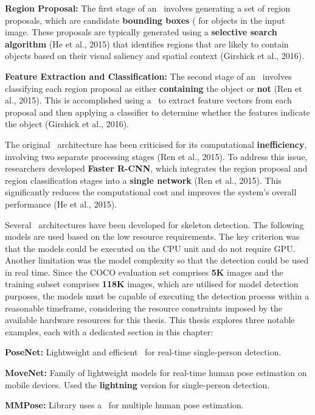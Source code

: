 \startitemize[1]
 \item {\bf Region Proposal:} The first stage of an \RCNN\ involves generating a set of region proposals, which are candidate {\bf bounding boxes} (\BBOX\) for objects in the input image. These proposals are typically generated using a {\bf selective search algorithm} (\scc He et al., 2015) that identifies regions that are likely to contain objects based on their visual saliency and spatial context (\scc Girshick et al., 2016).
 \item {\bf Feature Extraction and Classification:} The second stage of an \RCNN\ involves classifying each region proposal as either {\bf containing} the object or {\bf not} (\scc Ren et al., 2015). This is accomplished using a \CNN\ to extract feature vectors from each proposal and then applying a classifier to determine whether the features indicate the object (\scc Girshick et al., 2016).
\stopitemize

The original \RCNN\ architecture has been criticised for its computational {\bf inefficiency}, involving two separate processing stages (\scc Ren et al., 2015). To address this issue, researchers developed {\bf Faster R-CNN}, which integrates the region proposal and region classification stages into a {\bf single network} (\scc Ren et al., 2015). This significantly reduces the computational cost and improves the system's overall performance (\scc He et al., 2015).

Several \NN\ architectures have been developed for skeleton detection. The following models are used based on the low resource requirements. The key criterion was that the models could be executed on the CPU unit and do not require GPU. Another limitation was the model complexity so that the detection could be used in real time. Since the COCO evaluation set comprises {\bf 5K} images and the training subset comprises {\bf 118K} images, which are utilised for model detection purposes, the models must be capable of executing the detection process within a reasonable timeframe, considering the resource constraints imposed by the available hardware resources for this thesis. This thesis explores three notable examples, each with a dedicated section in this chapter:

\startitemize[n]
 \item {\bf PoseNet:} Lightweight and efficient \CNN\ for real-time single-person detection.
 \item {\bf MoveNet:} Family of lightweight models for real-time human pose estimation on mobile devices. Used the {\bf lightning} version for single-person detection.
 \item {\bf MMPose:} Library uses a \CNN\ for multiple human pose estimation.
\stopitemize

